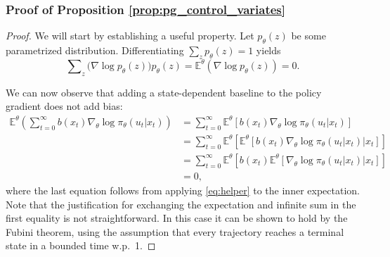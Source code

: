 \subsubsection{Proof of Proposition \ref{prop:pg_control_variates}}
\begin{proof}
We will start by establishing a useful property. 
Let $p_\theta(z)$ be some parametrized distribution. Differentiating $\sum\nolimits_{z } {{p_\theta }(z)}  = 1$  yields
\begin{equation}\label{eq:helper}
\sum\nolimits_{z} {(\nabla \log {p_\theta }({z})} ){p_\theta }({z}) = {\mathbb E^\theta }(\nabla \log {p_\theta }({z})) = 0.
\end{equation}

We can now observe that adding a state-dependent baseline to the policy gradient does not add bias:
\begin{equation*}
\begin{split}
{\mathbb E^\theta }\left( \sum_{t=0}^\infty b(x_t) {{\nabla _\theta }\log {\pi _\theta }({u_t}|{x_t})} \right) &= \sum_{t=0}^\infty {\mathbb E^\theta }\left[ b(x_t) {{\nabla _\theta }\log {\pi _\theta }({u_t}|{x_t})} \right] \\ 
&= \sum_{t=0}^\infty {\mathbb E^\theta }\left[ {\mathbb E^\theta }\left[ \left. b(x_t) {{\nabla _\theta }\log {\pi _\theta }({u_t}|{x_t})} \right| x_t \right]\right] \\ 
&= \sum_{t=0}^\infty {\mathbb E^\theta }\left[ b(x_t) {\mathbb E^\theta }\left[ \left. {{\nabla _\theta }\log {\pi _\theta }({u_t}|{x_t})} \right| x_t \right]\right] \\ 
&= 0,
\end{split}
\end{equation*}
where the last equation follows from applying \eqref{eq:helper} to the inner expectation. Note that the justification for exchanging the expectation and infinite sum in the first equality is not straightforward. In this case it can be shown to hold by the Fubini theorem, using the assumption that every trajectory reaches a terminal state in a bounded time w.p.~1.


\end{proof}
